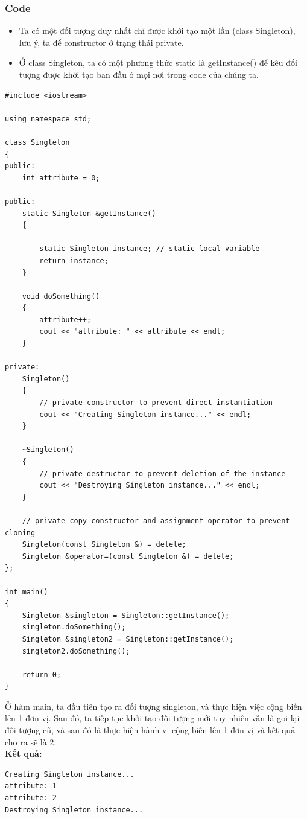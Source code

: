 \subsubsection{Code}
\begin{itemize}
    \item Ta có một đối tượng duy nhất chỉ được khởi tạo một lần (class Singleton), lưu ý, ta để constructor ở trạng thái private.
    \item Ở class Singleton, ta có một phương thức static là getInstance() để kêu đối tượng được khởi tạo ban đầu ở mọi nơi trong code của chúng ta.
\end{itemize}
\begin{lstlisting}
#include <iostream>

using namespace std;

class Singleton
{
public:
    int attribute = 0;

public:
    static Singleton &getInstance()
    {

        static Singleton instance; // static local variable
        return instance;
    }

    void doSomething()
    {
        attribute++;
        cout << "attribute: " << attribute << endl;
    }

private:
    Singleton()
    {
        // private constructor to prevent direct instantiation
        cout << "Creating Singleton instance..." << endl;
    }

    ~Singleton()
    {
        // private destructor to prevent deletion of the instance
        cout << "Destroying Singleton instance..." << endl;
    }

    // private copy constructor and assignment operator to prevent cloning
    Singleton(const Singleton &) = delete;
    Singleton &operator=(const Singleton &) = delete;
};

int main()
{
    Singleton &singleton = Singleton::getInstance();
    singleton.doSomething();
    Singleton &singleton2 = Singleton::getInstance();
    singleton2.doSomething();

    return 0;
}

\end{lstlisting}
Ở hàm main, ta đầu tiên tạo ra đối tượng singleton, và thực hiện việc cộng biến lên 1 đơn vị. Sau đó, ta tiếp tục khởi tạo đối tượng mới tuy nhiên vẫn là gọi lại đối tượng cũ, và sau đó là thực hiện hành vi cộng biến lên 1 đơn vị và kết quả cho ra sẽ là 2.\\
\newline
\textbf{Kết quả:}
\begin{lstlisting}
Creating Singleton instance...
attribute: 1
attribute: 2
Destroying Singleton instance...
\end{lstlisting}